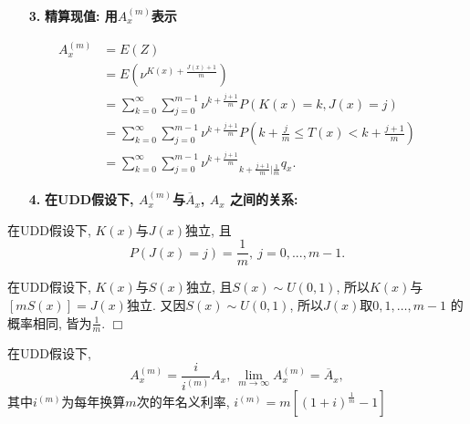 \documentclass[a4paper,openany, 10pt]{ctexbook}
\newcommand{\hei}{\CJKfamily{hei}}      %
\def\qed{\hfill$\Box$\medskip}
\begin{document}
\begin{itemize}
    \item[{\bf\hei 3.}]{\bf\hei 精算现值: 用$A_{x}^{(m)}$表示}
\end{itemize}
\begin{align*}
    A_{x}^{(m)} & =E(Z)                                                                                            \\
                & =E(\nu^{K(x)+\frac{J(x)+1}{m}})                                                                    \\
                & =\sum_{k=0}^{\infty}\sum_{j=0}^{m-1}\nu^{k+\frac{j+1}{m}}P(K(x)=k,J(x)=j)                          \\
                & =\sum_{k=0}^{\infty}\sum_{j=0}^{m-1}\nu^{k+\frac{j+1}{m}}P(k+\frac{j}{m}\leq T(x)<k+\frac{j+1}{m}) \\
                & =\sum_{k=0}^{\infty}\sum_{j=0}^{m-1}\nu^{k+\frac{j+1}{m}}{}_{k+\frac{j+1}{m}|\frac{1}{m}}q_{x}.
\end{align*}
\begin{itemize}
    \item[{\bf\hei 4.}]{\bf\hei 在UDD假设下, $A_{x}^{(m)}$与$\overline A_{x}$, $A_{x}$ 之间的关系:}
\end{itemize}

\begin{proposition}\label{prop2.7}
    在UDD假设下, $K(x)$与$J(x)$独立, 且$$P(J(x)=j)=\frac{1}{m},\ j=0, ..., m-1.$$
\end{proposition}

\proof
在UDD假设下, $K(x)$与$S(x)$独立, 且$S(x)\sim U(0,1)$, 所以$K(x)$与$[mS(x)]=J(x)$独立. 又因$S(x)\sim U(0,1)$, 所以$J(x)$取$0, 1, \dots, m-1$ 的概率相同, 皆为$\frac{1}{m}$.
\qed

\begin{proposition}
    在UDD假设下, $$A_{x}^{(m)}=\frac{i}{i^{(m)}}A_{x},\  \lim_{m\to\infty}A_{x}^{(m)}=\overline{A}_{x},$$ 其中$i^{(m)}$为每年换算$m$次的年名义利率, $i^{(m)}=m[(1+i)^{\frac{1}{m}}-1]$
\end{proposition}
\end{document}
